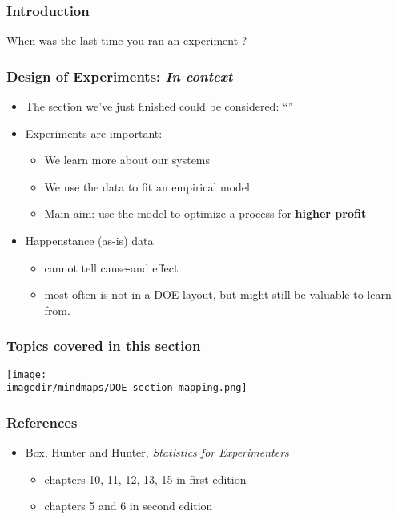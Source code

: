 \begin{frame}\frametitle{Introduction}
	\begin{exampleblock}{}
		{\Huge When was the last time you ran an experiment ?}
	\end{exampleblock}
\end{frame}

\begin{frame}\frametitle{Design of Experiments: \emph{In context}}
	\begin{itemize}
		\item	The section we've just finished could be considered: ``{\color{myOrange}{Empirical modelling of systems using a least squares model}}''
		
		\vspace{12pt}
		\item	Experiments are important:
		\begin{itemize}
			\item	We learn more about our systems
			\item	We use the data to fit an empirical model
			\item	Main aim: use the model to optimize a process for \textbf{higher profit}
		\end{itemize}
		
		\vspace{12pt}
		\item	Happenstance (as-is) data 
		\begin{itemize}
			\item	cannot tell cause-and effect
			\item	most often is not in a DOE layout, but might still be valuable to learn from.
		\end{itemize}
	\end{itemize}
\end{frame}

\begin{frame}\frametitle{Topics covered in this section}
	\begin{center}
		\texttt{[image: \\imagedir/mindmaps/DOE-section-mapping.png]}
	\end{center}
\end{frame}

\begin{frame}\frametitle{References}
	\begin{itemize}
		\item	Box, Hunter and Hunter, \emph{Statistics for Experimenters}
		\begin{itemize}
			\item	chapters 10, 11, 12, 13, 15 in first edition
			\item	chapters 5 and 6 in second edition
		\end{itemize}
	\end{itemize}
\end{frame}


